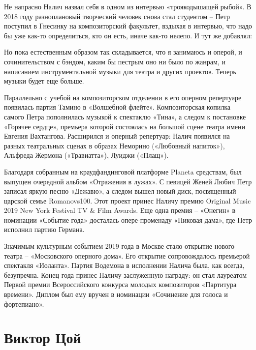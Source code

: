 Не напрасно Налич назвал себя в одном из интервью «троякодышащей рыбой». В 2018 году разноплановый творческий человек снова стал студентом – Петр поступил в Гнесинку на композиторский факультет, вздыхая в интервью, что надо бы уже как-то определиться, кто он есть, иначе как-то нелепо. И тут же добавлял:

\begin{fancyquotes}
    Но пока естественным образом так складывается, что я занимаюсь и оперой, и сочинительством с бэндом, каким бы пестрым оно ни было по жанрам, и написанием инструментальной музыки для театра и других проектов. Теперь музыки будет еще больше.
\end{fancyquotes}


Параллельно с учебой на композиторском отделении в его оперном репертуаре появилась партия Тамино в «Волшебной флейте». Композиторская копилка самого Петра пополнилась музыкой к спектаклю «Тина», а следом к постановке «Горячее сердце», премьера которой состоялась на большой сцене театра имени Евгения Вахтангова. Расширился и оперный репертуар: Налич появился на разных театральных сценах в образах Неморино («Любовный напиток»), Альфреда Жермона («Травиатта»), Луиджи («Плащ»).

Благодаря собранным на краудфандинговой платформе Planeta средствам, был выпущен очередной альбом «Отражения в лужах». С певицей Женей Любич Петр записал яркую песню «Дежавю», а следом вышел новый диск, посвященный царской семье Romanovs100. Этот проект принес Наличу премию Original Music 2019 New York Festival TV \& Film Awards. Еще одна премия – «Онегин» в номинации «Событие года» досталась опере-променаду «Пиковая дама», где Петр исполнил партию Германа.

Значимым культурным событием 2019 года в Москве стало открытие нового театра – «Московского оперного дома». Его открытие сопровождалось премьерой спектакля «Иоланта». Партия Водемона в исполнении Налича была, как всегда, безупречна. Конец года принес Наличу заслуженную награду: он стал лауреатом Первой премии Всероссийского конкурса молодых композиторов «Партитура времени». Диплом был ему вручен в номинации «Сочинение для голоса и фортепиано».




\section{Виктор Цой}
